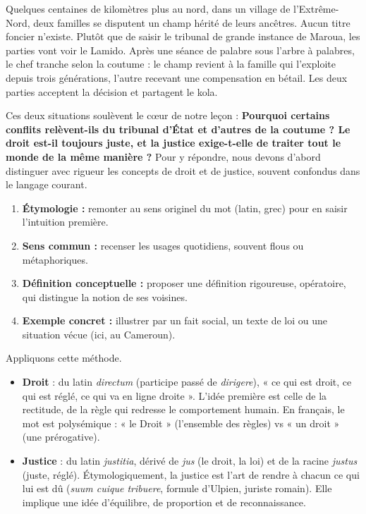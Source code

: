 \documentclass[11pt]{article}
\newcommand{\cle}[1]{{\popxbold\color{popdark}#1}}
\newcounter{popsec}
\newcounter{popsub}
\newcommand{\courssub}[1]{%
  \stepcounter{popsub}%
  \par\vspace{9pt}\noindent{\popxbold\fontsize{11.5}{13}\selectfont\color{popink}{\color{poporange}\thepopsec.\thepopsub}\hspace{6pt}#1}\par\nopagebreak\vspace{4pt}
}
\begin{document}
Quelques centaines de kilomètres plus au nord, dans un village de l'Extrême-Nord, deux familles se disputent un champ hérité de leurs ancêtres. Aucun titre foncier n'existe. Plutôt que de saisir le tribunal de grande instance de Maroua, les parties vont voir le Lamido. Après une séance de palabre sous l'arbre à palabres, le chef tranche selon la coutume : le champ revient à la famille qui l'exploite depuis trois générations, l'autre recevant une compensation en bétail. Les deux parties acceptent la décision et partagent le kola.

Ces deux situations soulèvent le cœur de notre leçon : \textbf{Pourquoi certains conflits relèvent-ils du tribunal d'État et d'autres de la coutume ? Le droit est-il toujours juste, et la justice exige-t-elle de traiter tout le monde de la même manière ?} Pour y répondre, nous devons d'abord distinguer avec rigueur les concepts de \cle{droit} et de \cle{justice}, souvent confondus dans le langage courant.

\courssub{Sens étymologique et approche initiale}

\begin{methode}
\begin{enumerate}
\item \textbf{Étymologie :} remonter au sens originel du mot (latin, grec) pour en saisir l'intuition première.
\item \textbf{Sens commun :} recenser les usages quotidiens, souvent flous ou métaphoriques.
\item \textbf{Définition conceptuelle :} proposer une définition rigoureuse, opératoire, qui distingue la notion de ses voisines.
\item \textbf{Exemple concret :} illustrer par un fait social, un texte de loi ou une situation vécue (ici, au Cameroun).
\end{enumerate}
\end{methode}

Appliquons cette méthode.

\begin{itemize}
\item \textbf{Droit} : du latin \emph{directum} (participe passé de \emph{dirigere}), « ce qui est droit, ce qui est réglé, ce qui va en ligne droite ». L'idée première est celle de la \cle{rectitude}, de la \cle{règle} qui redresse le comportement humain. En français, le mot est polysémique : « le Droit » (l'ensemble des règles) vs « un droit » (une prérogative).
\item \textbf{Justice} : du latin \emph{justitia}, dérivé de \emph{jus} (le droit, la loi) et de la racine \emph{justus} (juste, réglé). Étymologiquement, la justice est l'art de \cle{rendre à chacun ce qui lui est dû} (\emph{suum cuique tribuere}, formule d'Ulpien, juriste romain). Elle implique une idée d'\cle{équilibre}, de \cle{proportion} et de \cle{reconnaissance}.
\end{itemize}
\end{document}
